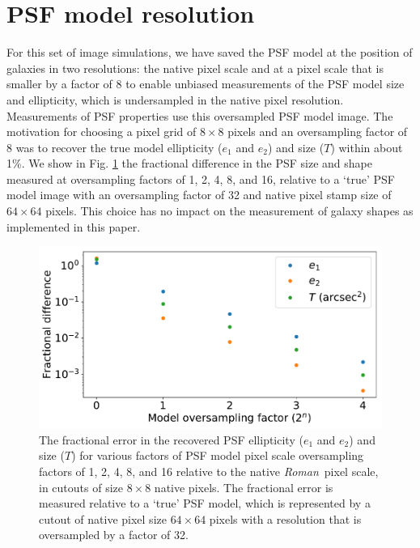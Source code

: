 \documentclass[usenatbib]{mnras}
\newcommand{\wfirst}{{\slshape Roman}}
\begin{document}
\section{PSF model resolution}
\label{app:psf_resol}

For this set of image simulations, we have saved the PSF model at the position of galaxies in two resolutions: the native pixel scale and at a pixel scale that is smaller by a factor of 8 to enable unbiased measurements of the PSF model size and ellipticity, which is undersampled in the native pixel resolution. Measurements of PSF properties use this oversampled PSF model image. The motivation for choosing a pixel grid of $8\times8$ pixels and an oversampling factor of 8 was to recover the true model ellipticity ($e_1$ and $e_2$) and size ($T$) within about 1\%. We show in Fig. \ref{fig:psf_oversampling} the fractional difference in the PSF size and shape measured at oversampling factors of 1, 2, 4, 8, and 16, relative to a `true' PSF model image with an oversampling factor of 32 and native pixel stamp size of $64\times 64$ pixels. This choice has no impact on the measurement of galaxy shapes as implemented in this paper.
 
\begin{figure}
\begin{center}
\includegraphics[width=\columnwidth]{figures/psf_oversampling.pdf}
\end{center}
\caption[]{
The fractional error in the recovered PSF ellipticity ($e_1$ and $e_2$) and size ($T$) for various factors of PSF model pixel scale oversampling factors of 1, 2, 4, 8, and 16 relative to the native \wfirst\ pixel scale, in cutouts of size $8\times 8$ native pixels. The fractional error is measured relative to a `true' PSF model, which is represented by a cutout of native pixel size $64\times64$ pixels with a resolution that is oversampled by a factor of 32.
\label{fig:psf_oversampling}}
\end{figure}
\end{document}
